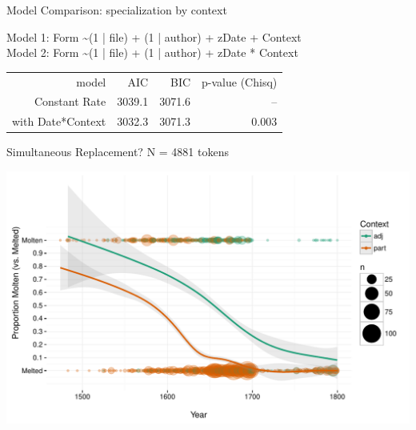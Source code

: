 \documentclass[hyperref={pdfpagelabels=false}]{beamer}
\begin{document}
\begin{frame}{Model Comparison: specialization by context}

\begin{center}
Model 1: Form \textasciitilde  (1 | file) + (1 | author) + zDate + Context\\
\vspace*{1mm}
Model 2: Form \textasciitilde  (1 | file) + (1 | author) + zDate{  }*{  }Context\\
\vspace*{4mm}

	\begin{tabular}{rrrr}
\toprule
	model & AIC & BIC & p-value (Chisq)\\
	\cmidrule{2-4}
Constant Rate & 3039.1 & 3071.6 & -- \\
with Date*Context &  3032.3 & 3071.3 & 0.003\\
\bottomrule
\end{tabular}
\end{center}
\end{frame}


\begin{frame}{Simultaneous Replacement? N =  4881 tokens}

\includegraphics[width=1.128\textwidth]{FormByDateUnbinnedWithDots2.pdf}
\end{frame}
\end{document}
